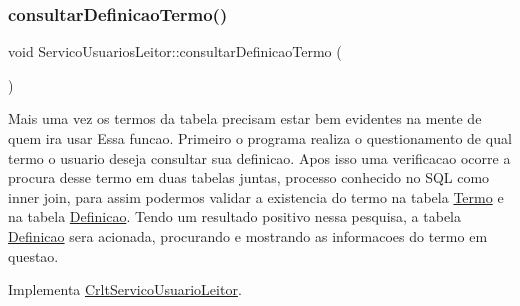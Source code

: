 \subsubsection{\texorpdfstring{consultar\+Definicao\+Termo()}{consultarDefinicaoTermo()}}
{\footnotesize\ttfamily void Servico\+Usuarios\+Leitor\+::consultar\+Definicao\+Termo (\begin{DoxyParamCaption}{ }\end{DoxyParamCaption})\hspace{0.3cm}{\ttfamily [virtual]}}

Mais uma vez os termos da tabela precisam estar bem evidentes na mente de quem ira usar Essa funcao. Primeiro o programa realiza o questionamento de qual termo o usuario deseja consultar sua definicao. Apos isso uma verificacao ocorre a procura desse termo em duas tabelas juntas, processo conhecido no S\+QL como inner join, para assim podermos validar a existencia do termo na tabela \mbox{\hyperlink{class_termo}{Termo}} e na tabela \mbox{\hyperlink{class_definicao}{Definicao}}. Tendo um resultado positivo nessa pesquisa, a tabela \mbox{\hyperlink{class_definicao}{Definicao}} sera acionada, procurando e mostrando as informacoes do termo em questao.

Implementa \mbox{\hyperlink{class_crlt_servico_usuario_leitor_aefac628815c948981d03e2ad00033b47}{Crlt\+Servico\+Usuario\+Leitor}}.


